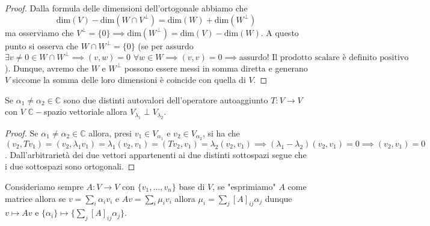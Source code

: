 \documentclass[12pt, twoside, italian, openany]{book}
\begin{document}
	\begin{proof}
		Dalla formula delle dimensioni dell'ortogonale abbiamo che
		$$
		\text{dim}(V) - \text{dim}(W \cap V^\perp) = \text{dim}(W) + \text{dim}(W^{\perp})
		$$
		ma osserviamo che $V^\perp = \{ 0 \} \implies \text{dim}(W^\perp) = \text{dim}(V) - \text{dim}(W)$. A questo punto si osserva che $W \cap W^{\perp} = \{ 0 \}$ (se per assurdo $\exists v \neq 0 \in W \cap W^{\perp} \implies (v, w) = 0 \, \, \forall w \in W \implies (v, v) = 0 \implies \text{assurdo! Il prodotto scalare è definito positivo}$). Dunque, avremo che $W$ e $W^{\perp}$ possono essere messi in somma diretta e generano $V$ siccome la somma delle loro dimensioni è coincide con quella di $V$.
	\end{proof}
	\begin{prop}
		Se $\alpha_1 \neq \alpha_2 \in \mathbb{C}$ sono due distinti autovalori dell'operatore autoaggiunto $T:V \to V$ con $V$ $\mathbb{C}-$spazio vettoriale allora $V_{\lambda_1} \perp V_{\lambda_2}$.
	\end{prop}
	\begin{proof}
		Se $\alpha_1 \neq \alpha_2 \in \mathbb{C}$ allora, presi $v_1 \in V_{\alpha_1}$ e $v_2 \in V_{\alpha_2}$, si ha che $(v_2, Tv_1) = (v_2, \lambda_1 v_1) = \lambda_1 (v_2, v_1) = (Tv_2, v_1) = \lambda_2 (v_2, v_1) \implies (\lambda_1 - \lambda_2) (v_2, v_1) = 0 \implies (v_2, v_1) = 0$. Dall'arbitrarietà dei due vettori appartenenti ai due distinti sottospazi segue che i due sottospazi sono ortogonali.
	\end{proof}
	Consideriamo sempre $A: V \to V$ con $\{ v_1, \ldots, v_n \}$ base di $V$, se "esprimiamo" $A$ come matrice allora se $v = \sum\limits_i \alpha_i v_i$ e $Av = \sum\limits_i \mu_i v_i$ allora $\mu_i = \sum\limits_j [A]_{ij} \alpha_j$ dunque $v \mapsto Av$ e $\{ \alpha_i \} \mapsto \{ \sum\limits_j [A]_{ij} \alpha_j \}$. 






\end{document}
